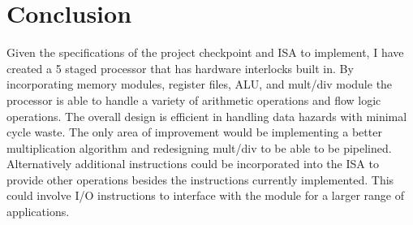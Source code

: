 \documentclass[letterpaper]{article} %
\begin{document}
\section*{Conclusion}

Given the specifications of the project checkpoint and ISA to implement, I have created a 5 staged processor that has hardware interlocks built in. By incorporating memory modules, register files, ALU, and mult/div module the processor is able to handle a variety of arithmetic operations and flow logic operations. The overall design is efficient in handling data hazards with minimal cycle waste. The only area of improvement would be implementing a better multiplication algorithm and redesigning mult/div to be able to be pipelined. Alternatively additional instructions could be incorporated into the ISA to provide other operations besides the instructions currently implemented. This could involve I/O instructions to interface with the module for a larger range of applications.
\end{document}
